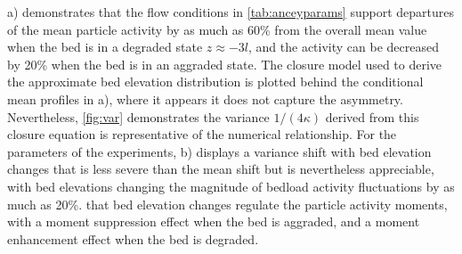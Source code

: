 \DIFdelbegin {}\DIFdelend \DIFaddbegin {}\DIFaddend a) demonstrates that the flow conditions in \DIFdelbegin {}\DIFdelend \DIFaddbegin {}\DIFaddend \ref{tab:anceyparams} support departures of the mean particle activity by as much as 60\% from the overall mean value when the bed is in a degraded state $z\approx -3l$, and the activity can be decreased by 20\% when the bed is in an aggraded state.
The closure model \DIFdelbegin \DIFdel{(\ref{eq:closure} ) }\DIFdelend \DIFaddbegin \DIFadd{\ref{eq:closure} }\DIFaddend used to derive the approximate bed elevation distribution \DIFdelbegin \DIFdel{(\ref{eq:ou2} ) }\DIFdelend \DIFaddbegin \DIFadd{\ref{eq:ou2} }\DIFaddend is plotted behind the conditional mean profiles in \DIFdelbegin {}\DIFdelend \DIFaddbegin {}\DIFaddend a), where it appears \DIFdelbegin {}\DIFdelend \DIFaddbegin {}\DIFaddend it does not capture the asymmetry.
Nevertheless, \DIFdelbegin {}\DIFdelend \DIFaddbegin {}\DIFaddend \ref{fig:var} demonstrates the variance $1/(4\kappa)$ derived from this closure equation is representative of the numerical relationship.
For the parameters of the \citet{Ancey2008} experiments, \DIFdelbegin {}\DIFdelend \DIFaddbegin {}\DIFaddend b) displays a variance shift with bed elevation changes that is less severe than the mean shift but is nevertheless appreciable, with bed elevations changing the magnitude of bedload activity fluctuations by as much as 20\%.
\DIFdelbegin {}\DIFdelend \DIFaddbegin {}\DIFaddend that bed elevation changes regulate the \DIFaddbegin {}\DIFaddend particle activity moments, with a moment suppression effect when the bed is aggraded, and a moment enhancement effect when the bed is degraded.

